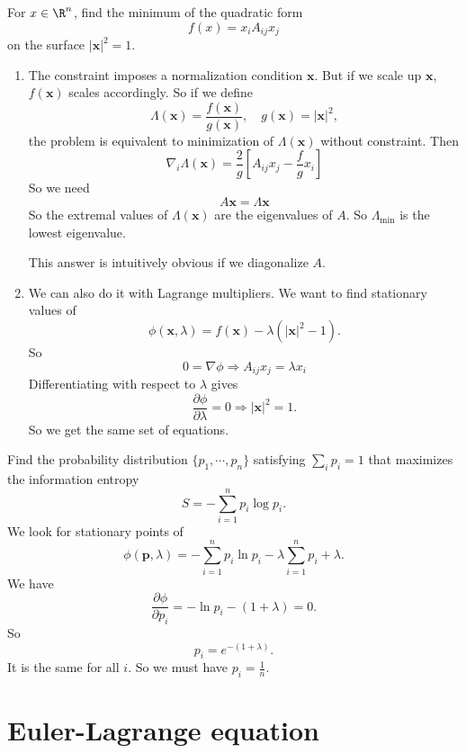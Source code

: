 \documentclass[a4paper]{article}
\begin{document}
\begin{eg}
  For $x\in \R^n$, find the minimum of the quadratic form
  \[
    f(x) = x_i A_{ij}x_j
  \]
  on the surface $|\mathbf{x}|^2 = 1$.

  \begin{enumerate}
  \item The constraint imposes a normalization condition $\mathbf{x}$. But if we scale up $\mathbf{x}$, $f(\mathbf{x})$ scales accordingly. So if we define
    \[
      \Lambda(\mathbf{x}) = \frac{f(\mathbf{x})}{g(\mathbf{x})},\quad g(\mathbf{x}) = |\mathbf{x}|^2,
    \]
    the problem is equivalent to minimization of $\Lambda (\mathbf{x})$ without constraint. Then
    \[
      \nabla_i \Lambda(\mathbf{x}) = \frac{2}{g}\left[A_{ij} x_j - \frac{f}{g} x_i\right]
    \]
    So we need
    \[
      A\mathbf{x} = \Lambda \mathbf{x}
    \]
    So the extremal values of $\Lambda (\mathbf{x})$ are the eigenvalues of $A$. So $\Lambda_{\min}$ is the lowest eigenvalue.

    This answer is intuitively obvious if we diagonalize $A$.

  \item We can also do it with Lagrange multipliers. We want to find stationary values of
    \[
      \phi(\mathbf{x}, \lambda) = f(\mathbf{x}) - \lambda(|\mathbf{x}|^2 - 1).
    \]
    So
    \[
      0 = \nabla \phi \Rightarrow  A_{ij} x_j = \lambda x_i
    \]
    Differentiating with respect to $\lambda$ gives
    \[
      \frac{\partial \phi}{\partial \lambda} = 0 \Rightarrow  |\mathbf{x}|^2 = 1.
    \]
    So we get the same set of equations.
  \end{enumerate}
\end{eg}

\begin{eg}
  Find the probability distribution $\{p_1, \cdots, p_n\}$ satisfying $\sum_i p_i = 1$ that maximizes the information entropy
  \[
    S = - \sum_{i = 1}^n p_i \log p_i.
  \]
  We look for stationary points of
  \[
    \phi(\mathbf{p}, \lambda) = -\sum_{i = 1}^n p_i \ln p_i - \lambda\sum_{i = 1}^n p_i + \lambda.
  \]
  We have
  \[
    \frac{\partial \phi}{\partial p_i}= - \ln p_i - (1 + \lambda) = 0.
  \]
  So
  \[
    p_i = e^{-(1 + \lambda)}.
  \]
  It is the same for all $i$. So we must have $p_i = \frac{1}{n}$.
\end{eg}

\section{Euler-Lagrange equation}
\end{document}
